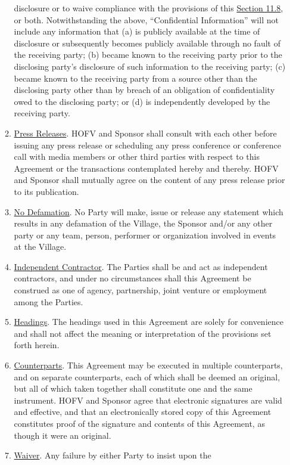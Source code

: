 \documentclass[]{article}
\begin{document}
\begin{enumerate}
\begin{enumerate}
    disclosure or to waive compliance with the provisions of this
    \uline{Section 11.8}, or both. Notwithstanding the above,
    ``Confidential Information'' will not include any information that
    (a) is publicly available at the time of disclosure or subsequently
    becomes publicly available through no fault of the receiving party;
    (b) became known to the receiving party prior to the disclosing
    party's disclosure of such information to the receiving party; (c)
    became known to the receiving party from a source other than the
    disclosing party other than by breach of an obligation of
    confidentiality owed to the disclosing party; or (d) is
    independently developed by the receiving party.
  \item
    \uline{Press Releases}. HOFV and Sponsor shall consult with each
    other before issuing any press release or scheduling any press
    conference or conference call with media members or other third
    parties with respect to this Agreement or the transactions
    contemplated hereby and thereby. HOFV and Sponsor shall mutually
    agree on the content of any press release prior to its publication.
  \item
    \uline{No Defamation}. No Party will make, issue or release any
    statement which results in any defamation of the Village, the
    Sponsor and/or any other party or any team, person, performer or
    organization involved in events at the Village.
  \item
    \uline{Independent Contractor}. The Parties shall be and act as
    independent contractors, and under no circumstances shall this
    Agreement be construed as one of agency, partnership, joint venture
    or employment among the Parties.
  \item
    \uline{Headings}. The headings used in this Agreement are solely for
    convenience and shall not affect the meaning or interpretation of
    the provisions set forth herein.
  \item
    \uline{Counterparts}. This Agreement may be executed in multiple
    counterparts, and on separate counterparts, each of which shall be
    deemed an original, but all of which taken together shall constitute
    one and the same instrument. HOFV and Sponsor agree that electronic
    signatures are valid and effective, and that an electronically
    stored copy of this Agreement constitutes proof of the signature and
    contents of this Agreement, as though it were an original.
  \item
    \uline{Waiver}. Any failure by either Party to insist upon the

\end{enumerate}
\end{enumerate}
\end{document}
